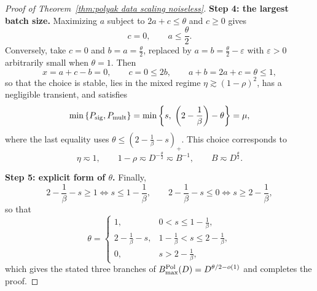 \begin{proof}[Proof of Theorem~\ref{thm:polyak data scaling noiseless}]
\textbf{Step 4: the largest batch size.} Maximizing \(a\) subject to \(2a+c\leq\theta\) and \(c\geq0\) gives
\[
    c=0,
    \qquad
    a\leq\frac{\theta}{2}.
\]
Conversely, take \(c=0\) and \(b=a=\frac{\theta}{2}\), replaced by \(a=b=\frac{\theta}{2}-\varepsilon\) with \(\varepsilon>0\) arbitrarily small when \(\theta=1\). Then
\[
    x=a+c-b=0,
    \qquad
    c=0\leq2b,
    \qquad
    a+b=2a+c=\theta\leq1,
\]
so that the choice is stable, lies in the mixed regime \(\eta\gtrsim(1-\rho)^{2}\), has a negligible transient, and satisfies
\[
    \min\left\{P_{\rm sig},P_{\rm mult}\right\}
    =
    \min\left\{s,\;\left(2-\frac1\beta\right)-\theta\right\}
    =
    \mu ,
\]
where the last equality uses \(\theta\leq\left(2-\frac1\beta-s\right)_{+}\). This choice corresponds to
\[
    \eta\eqsim1,
    \qquad
    1-\rho\eqsim D^{-\frac\theta2}\eqsim B^{-1},
    \qquad
    B\eqsim D^{\frac\theta2}.
\]

\textbf{Step 5: explicit form of \(\theta\).} Finally,
\[
    2-\frac1\beta-s\geq1
    \iff
    s\leq1-\frac1\beta,
    \qquad
    2-\frac1\beta-s\leq0
    \iff
    s\geq2-\frac1\beta,
\]
so that
\[
    \theta
    =
    \begin{cases}
    1, & 0<s\leq1-\frac1\beta,\\[1mm]
    2-\frac1\beta-s, & 1-\frac1\beta<s\leq2-\frac1\beta,\\[1mm]
    0, & s>2-\frac1\beta,
    \end{cases}
\]
which gives the stated three branches of \(B_{\max}^{\rm Pol}(D)=D^{\theta/2-o(1)}\) and completes the proof.
\end{proof}

